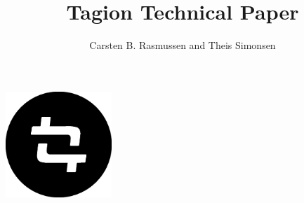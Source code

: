 \documentclass[a4paper,10pt]{article}
\title{Tagion Technical Paper}
\author{Carsten B. Rasmussen and Theis Simonsen}
\begin{document}
\begin{titlepage}
\maketitle
\begin{center}
\includegraphics[width = 40mm]{fig/logomark-black.eps}
\end{center}
\thispagestyle{empty}

\centering
\gitversion
\end{titlepage}


\pagebreak
{}
\tableofcontents

\pagebreak
{}
%


\pagebreak


\pagebreak


\pagebreak


\pagebreak


\pagebreak


\pagebreak


%

\pagebreak


%

\pagebreak



%

\pagebreak


%
%
\appendix

\pagebreak
{}


\pagebreak


\pagebreak


\pagebreak


\pagebreak


\pagebreak


\pagebreak


\pagebreak


\pagebreak


\pagebreak


\pagebreak
\listoftables

\pagebreak
\listoffigures

\pagebreak
\printnomenclature

\pagebreak
%
%
\printbibliography
\end{document}
